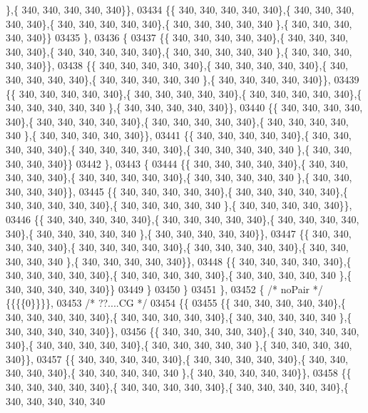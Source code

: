 \begin{DoxyCode}
      \},\{ 340, 340, 340, 340, 340\}\},
03434 \{\{ 340, 340, 340, 340, 340\},\{ 340, 340, 340, 340, 340\},\{ 340, 340, 340, 340, 340\},\{ 340, 340, 340, 340, 340
      \},\{ 340, 340, 340, 340, 340\}\}
03435 \},
03436 \{
03437 \{\{ 340, 340, 340, 340, 340\},\{ 340, 340, 340, 340, 340\},\{ 340, 340, 340, 340, 340\},\{ 340, 340, 340, 340, 340
      \},\{ 340, 340, 340, 340, 340\}\},
03438 \{\{ 340, 340, 340, 340, 340\},\{ 340, 340, 340, 340, 340\},\{ 340, 340, 340, 340, 340\},\{ 340, 340, 340, 340, 340
      \},\{ 340, 340, 340, 340, 340\}\},
03439 \{\{ 340, 340, 340, 340, 340\},\{ 340, 340, 340, 340, 340\},\{ 340, 340, 340, 340, 340\},\{ 340, 340, 340, 340, 340
      \},\{ 340, 340, 340, 340, 340\}\},
03440 \{\{ 340, 340, 340, 340, 340\},\{ 340, 340, 340, 340, 340\},\{ 340, 340, 340, 340, 340\},\{ 340, 340, 340, 340, 340
      \},\{ 340, 340, 340, 340, 340\}\},
03441 \{\{ 340, 340, 340, 340, 340\},\{ 340, 340, 340, 340, 340\},\{ 340, 340, 340, 340, 340\},\{ 340, 340, 340, 340, 340
      \},\{ 340, 340, 340, 340, 340\}\}
03442 \},
03443 \{
03444 \{\{ 340, 340, 340, 340, 340\},\{ 340, 340, 340, 340, 340\},\{ 340, 340, 340, 340, 340\},\{ 340, 340, 340, 340, 340
      \},\{ 340, 340, 340, 340, 340\}\},
03445 \{\{ 340, 340, 340, 340, 340\},\{ 340, 340, 340, 340, 340\},\{ 340, 340, 340, 340, 340\},\{ 340, 340, 340, 340, 340
      \},\{ 340, 340, 340, 340, 340\}\},
03446 \{\{ 340, 340, 340, 340, 340\},\{ 340, 340, 340, 340, 340\},\{ 340, 340, 340, 340, 340\},\{ 340, 340, 340, 340, 340
      \},\{ 340, 340, 340, 340, 340\}\},
03447 \{\{ 340, 340, 340, 340, 340\},\{ 340, 340, 340, 340, 340\},\{ 340, 340, 340, 340, 340\},\{ 340, 340, 340, 340, 340
      \},\{ 340, 340, 340, 340, 340\}\},
03448 \{\{ 340, 340, 340, 340, 340\},\{ 340, 340, 340, 340, 340\},\{ 340, 340, 340, 340, 340\},\{ 340, 340, 340, 340, 340
      \},\{ 340, 340, 340, 340, 340\}\}
03449 \}
03450 \}
03451 \},
03452 \{ \textcolor{comment}{/* noPair */} \{\{\{\{0\}\}\}\},
03453 \textcolor{comment}{/* ??....CG */}
03454 \{\{
03455 \{\{ 340, 340, 340, 340, 340\},\{ 340, 340, 340, 340, 340\},\{ 340, 340, 340, 340, 340\},\{ 340, 340, 340, 340, 340
      \},\{ 340, 340, 340, 340, 340\}\},
03456 \{\{ 340, 340, 340, 340, 340\},\{ 340, 340, 340, 340, 340\},\{ 340, 340, 340, 340, 340\},\{ 340, 340, 340, 340, 340
      \},\{ 340, 340, 340, 340, 340\}\},
03457 \{\{ 340, 340, 340, 340, 340\},\{ 340, 340, 340, 340, 340\},\{ 340, 340, 340, 340, 340\},\{ 340, 340, 340, 340, 340
      \},\{ 340, 340, 340, 340, 340\}\},
03458 \{\{ 340, 340, 340, 340, 340\},\{ 340, 340, 340, 340, 340\},\{ 340, 340, 340, 340, 340\},\{ 340, 340, 340, 340, 340

\end{DoxyCode}
